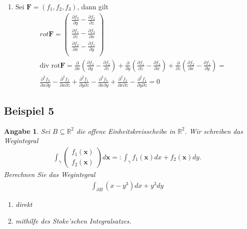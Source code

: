 \documentclass[]{article}
\newtheorem*{angabe*}{Angabe}
\begin{document}
\begin{enumerate}[label=(\roman*)]
	\item Sei $\bm{F} = (f_1, f_2, f_3)$, dann gilt
	\begin{align*}
		rot \bm{F} = \begin{pmatrix}
			\frac{\partial f_3}{\partial y} - \frac{\partial f_2}{\partial z}\\
			\frac{\partial f_1}{\partial z} - \frac{\partial f_3}{\partial x}\\
			\frac{\partial f_2}{\partial x} - \frac{\partial f_1}{\partial y}\\
		\end{pmatrix}\\
		\text{div rot} \bm{F} = \frac{\partial}{\partial x} \left(\frac{\partial f_3}{\partial y} - \frac{\partial f_2}{\partial z}\right) + \frac{\partial}{\partial y} \left(\frac{\partial f_1}{\partial z} - \frac{\partial f_3}{\partial x}\right) + \frac{\partial}{\partial z} \left(\frac{\partial f_2}{\partial x} - \frac{\partial f_1}{\partial y}\right) = \\
		\frac{\partial^2 f_3}{\partial x \partial y} - \frac{\partial^2 f_2}{\partial x \partial z} + \frac{\partial^2 f_1}{\partial y \partial z} - \frac{\partial^2 f_3}{\partial x \partial y} + \frac{\partial^2 f_2}{\partial x \partial z} - \frac{\partial^2 f_1}{\partial y \partial z} = 0
	\end{align*}
\end{enumerate}
\newpage

\subsection*{Beispiel 5}
\begin{angabe*}
	Sei $B \subseteq \mathbb{R}^2$ die offene Einheitskreisscheibe in $\mathbb{R}^2$. Wir schreiben das Wegintegral
	\begin{align*}
		\int_\gamma \begin{pmatrix}	f_1(\bm{x})\\ f_2(\bm{x}) \end{pmatrix} d\bm{x} =: \int_\gamma f_1(\bm{x}) dx + f_2(\bm{x}) dy.
	\end{align*}
	Berechnen Sie das Wegintegral
	\begin{align*}
		\int_{\partial B} (x-y^3) dx + y^3 dy
	\end{align*}
	\begin{enumerate}[label*=(\roman*)]
		\item direkt
		\item mithilfe des Stoke'schen Integralsatzes.
	\end{enumerate}
\end{angabe*}
\end{document}
